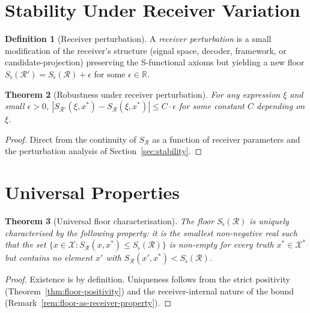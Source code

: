 \documentclass[twocolumn,11pt,a4paper]{article}
\theoremstyle{thmstyle}
\newtheorem{theorem}{Theorem}[section]
\theoremstyle{thmstyle}
\theoremstyle{definition}
\newtheorem{definition}[theorem]{Definition}
\theoremstyle{remark}
\newcommand{\Real}{\mathbb{R}}
\newcommand{\Cands}{\mathcal{X}}
\newcommand{\Truth}{\mathcal{X}^{*}}
\newcommand{\receiver}{\mathcal{R}}
\newcommand{\Sscalar}{S}
\newcommand{\Sfloor}{S_{\flat}}
\begin{document}
\section{Stability Under Receiver Variation}
\label{sec:rec-var}

\begin{definition}[Receiver perturbation]
\label{def:rec-pert}
A \emph{receiver perturbation} is a small
modification of the receiver's structure (signal
space, decoder, framework, or candidate-projection)
preserving the S-functional axioms but yielding a
new floor $\Sfloor(\receiver') = \Sfloor(\receiver)
+ \epsilon$ for some $\epsilon \in \Real$.
\end{definition}

\begin{theorem}[Robustness under receiver
perturbation]\label{thm:robust-rec-pert}
For any expression $\xi$ and small $\epsilon > 0$,
$|\Sscalar_{\receiver'}(\xi, x^{*}) -
\Sscalar_{\receiver}(\xi, x^{*})| \leq C \cdot
\epsilon$ for some constant $C$ depending on
$\xi$.
\end{theorem}

\begin{proof}
Direct from the continuity of
$\Sscalar_{\receiver}$ as a function of receiver
parameters and the perturbation analysis of
Section~\ref{sec:stability}.
\end{proof}

\section{Universal Properties}
\label{sec:universal-props}

\begin{theorem}[Universal floor characterisation]
\label{thm:univ-floor}
The floor $\Sfloor(\receiver)$ is uniquely
characterised by the following property: it is
the smallest non-negative real such that the set
$\{x \in \Cands : \Sscalar_{\receiver}(x, x^{*})
\leq \Sfloor(\receiver)\}$ is non-empty for every
truth $x^{*} \in \Truth$ but contains no element
$x'$ with $\Sscalar_{\receiver}(x', x^{*}) <
\Sfloor(\receiver)$.
\end{theorem}

\begin{proof}
Existence is by definition.  Uniqueness follows
from the strict positivity (Theorem~\ref{thm:floor-positivity})
and the receiver-internal nature of the bound
(Remark~\ref{rem:floor-as-receiver-property}).
\end{proof}
\end{document}
